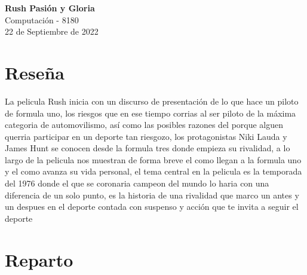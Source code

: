 \documentclass[ä5paper, 11pt]{article}
\begin{document}
\begin{center}

\huge{\textbf{Rush Pasión y Gloria}}\\
\Large{Computación - 8180\\
22 de Septiembre de 2022}
\end{center}

\section*{Reseña}
\textcolor{gris}{La pelicula Rush inicia con un discurso de presentación de lo que hace un piloto de formula uno, los riesgos que en ese tiempo corrias al ser piloto de la máxima categoria de automovilismo, así como las posibles razones del porque alguen querria participar en un deporte tan riesgozo, los protagonistas Niki Lauda y James Hunt se conocen desde la formula tres donde empieza su rivalidad, a lo largo de la pelicula nos muestran de forma breve el como llegan a la formula uno y el como avanza su vida personal, el tema central en la pelicula es la temporada del 1976 donde el que se coronaria campeon del mundo lo haria con una diferencia de un solo punto, es la historia de una rivalidad que marco un antes y un despues en el deporte contada con suspenso y acción que te invita a seguir el deporte}
\section*{Reparto}
\end{document}
